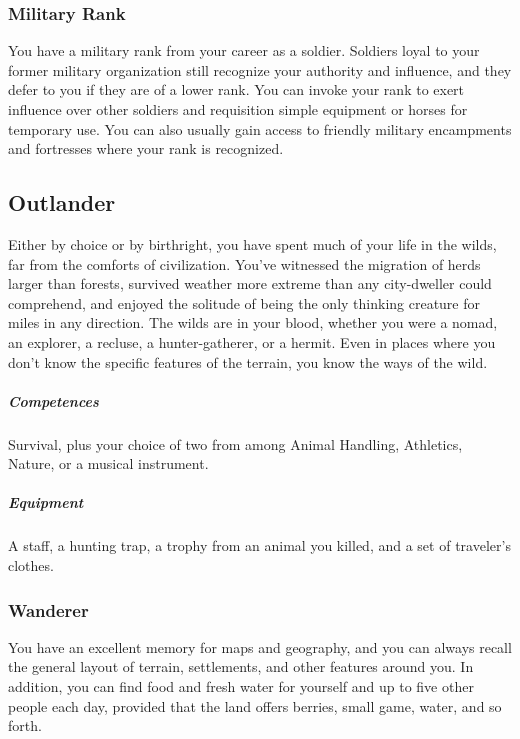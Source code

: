     \subsubsection{Military Rank}
        You have a military rank from your career as a soldier.
        Soldiers loyal to your former military organization still recognize your authority and influence, and they defer to you if they are of a lower rank.
        You can invoke your rank to exert influence over other soldiers and requisition simple equipment or horses for temporary use.
        You can also usually gain access to friendly military encampments and fortresses where your rank is recognized.

\subsection*{Outlander} \label{ssec::outlander}
    Either by choice or by birthright, you have spent much of your life in the wilds, far from the comforts of civilization.
    You've witnessed the migration of herds larger than forests, survived weather more extreme than any city-dweller could comprehend, and enjoyed the solitude of being the only thinking creature for miles in any direction.
    The wilds are in your blood, whether you were a nomad, an explorer, a recluse, a hunter-gatherer, or a hermit.
    Even in places where you don't know the specific features of the terrain, you know the ways of the wild.
    \subparagraph{Competences} Survival, plus your choice of two from among Animal Handling, Athletics, Nature, or a musical instrument.
    \subparagraph{Equipment} A staff, a hunting trap, a trophy from an animal you killed, and a set of traveler's clothes.
    \subsubsection{Wanderer}
        You have an excellent memory for maps and geography, and you can always recall the general layout of terrain, settlements, and other features around you.
        In addition, you can find food and fresh water for yourself and up to five other people each day, provided that the land offers berries, small game, water, and so forth.

